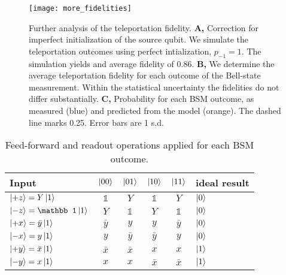 \clearpage

\begin{figure*}[p]
    \centering
    \texttt{[image: more\_fidelities]}
    \caption{
    \label{fig:more_fidelities}
    Further analysis of the teleportation fidelity.
    \textbf{A,} Correction for imperfect initialization of the source qubit. We simulate the teleportation outcomes using perfect intialization, $p_{-1} = 1$. The simulation yields and average fidelity of 0.86.
    \textbf{B,} We determine the average teleportation fidelity for each outcome of the Bell-state measurement. Within the statistical uncertainty the fidelities do not differ substantially.
    \textbf{C,} Probability for each BSM outcome, as measured (blue) and predicted from the model (orange). The dashed line marks 0.25. Error bars are 1 s.d.
    }
\end{figure*}

\clearpage

\begin{table}[htp]
    \centering
    \caption{
    \label{tab:psiminus-operations}
    Feed-forward and readout operations applied for each BSM outcome.}
    \vspace{.2cm}
    \begin{tabular}{l | c c c c || l}
        Input & $\left|00\right>$ & $\left|01\right>$ & $\left|10\right>$ & $\left|11\right>$ & ideal result \\
        \hline
        $\left|+z\right> = Y\left|1\right>$ & $\mathbb 1$ & $Y$ & $\mathbb 1$ & $Y$ & $\left|0\right>$ \\
        $\ket{-z} = \mathbb 1 \ket{1}$ & $Y$ & $\mathbb 1$ & $Y$ & $\mathbb 1$ & $\left|0\right>$ \\
        $\left|+x\right> = \bar y \left|1\right>$ & $\bar y$ & $y$ & $y$ & $\bar y$ & $\left|0\right>$ \\
        $\left|-x\right> = y \left|1\right>$ & $y$ & $\bar y$ & $\bar y$ & $y$ & $\left|0\right>$ \\
        $\left|+y\right> = \bar x \left|1\right>$ & $\bar x$ & $\bar x$ & $x$ & $x$ & $\left|1\right>$\\
        $\left|-y\right> = x \left|1\right>$ & $x$ & $x$ & $\bar x$ & $\bar x$ & $\left|1\right>$\\
    \end{tabular}
\end{table}

\clearpage




